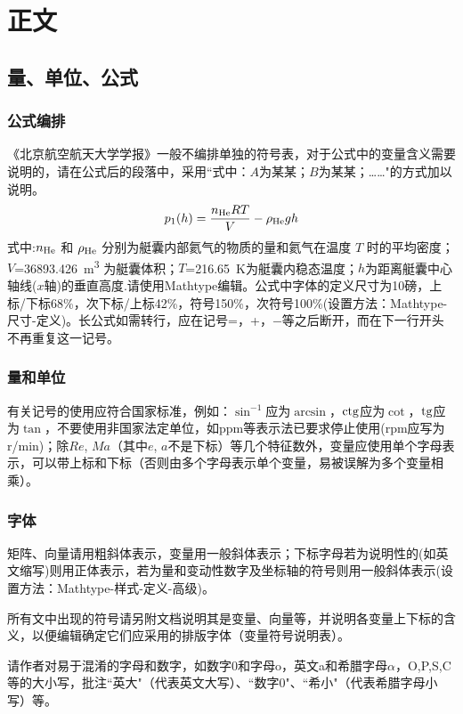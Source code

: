 \documentclass[10.5pt,twocolumn]{jbuaa}
\begin{document}
\section{正文}
\subsection{量、单位、公式}
\subsubsection{公式编排}
\label{labSecForm}
《北京航空航天大学学报》一般不编排单独的符号表，对于公式中的变量含义需要说明的，请在公式后的段落中，采用``式中：$A$为某某；$B$为某某；……"的方式加以说明。
\begin{equation}
 \label{eqnLabelp}
 p_1 (h) = \dfrac{n_{\textnormal{He}}RT}{V}-\rho_{\textnormal{He}}gh
\end{equation}
式中:$n_{\textnormal{He}}$ 和 $\rho_{\textnormal{He}}$ 分别为艇囊内部氦气的物质的量和氦气在温度 $T$ 时的平均密度；
$V$=\SI{36893.426}{\cubic\meter}%
为艇囊体积；$T$=\SI{216.65}{\kelvin}为艇囊内稳态温度；$h$为距离艇囊中心轴线($x$轴)的垂直高度.请使用Mathtype编辑。公式中字体的定义尺寸为10磅，上标/下标68\%，次下标/上标42\%，符号150\%，次符号100\%(设置方法：Mathtype-尺寸-定义)。长公式如需转行，应在记号=，+，$-$等之后断开，而在下一行开头不再重复这一记号。

\subsubsection{量和单位}
有关记号的使用应符合国家标准，例如：$\sin^{-1}$应为$\arcsin$，$\rm ctg$应为$\cot$，$\rm tg$应为$\tan$，不要使用非国家法定单位，如ppm等表示法已要求停止使用(rpm应写为r/min)；除$Re$, $Ma$（其中$e$, $a$不是下标）等几个特征数外，变量应使用单个字母表示，可以带上标和下标（否则由多个字母表示单个变量，易被误解为多个变量相乘）。

\subsubsection{字体}
矩阵、向量请用粗斜体表示，变量用一般斜体表示；下标字母若为说明性的(如英文缩写)则用正体表示，若为量和变动性数字及坐标轴的符号则用一般斜体表示(设置方法：Mathtype-样式-定义-高级)。

所有文中出现的符号请另附文档说明其是变量、向量等，并说明各变量上下标的含义，以便编辑确定它们应采用的排版字体（变量符号说明表）。

请作者对易于混淆的字母和数字，如数字0和字母o，英文a和希腊字母$\alpha$，O,P,S,C等的大小写，批注``英大"（代表英文大写）、``数字0"、``希小"（代表希腊字母小写）等。
\end{document}
